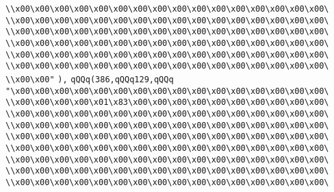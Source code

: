 \verb|\\x00\x00\x00\x00\x00\x00\x00\x00\x00\x00\x00\x00\x00\x00\x00\x00\|\newline
\verb|\\x00\x00\x00\x00\x00\x00\x00\x00\x00\x00\x00\x00\x00\x00\x00\x00\|\newline
\verb|\\x00\x00\x00\x00\x00\x00\x00\x00\x00\x00\x00\x00\x00\x00\x00\x00\|\newline
\verb|\\x00\x00\x00\x00\x00\x00\x00\x00\x00\x00\x00\x00\x00\x00\x00\x00\|\newline
\verb|\\x00\x00\x00\x00\x00\x00\x00\x00\x00\x00\x00\x00\x00\x00\x00\x00\|\newline
\verb|\\x00\x00\x00\x00\x00\x00\x00\x00\x00\x00\x00\x00\x00\x00\x00\x00\|\newline
\verb|\\x00\x00"|\newline
\verb|),|\newline
\verb|qQQq(386,qQQq129,qQQq|\newline
\verb|"\x00\x00\x00\x00\x00\x00\x00\x00\x00\x00\x00\x00\x00\x00\x00\x00\|\newline
\verb|\\x00\x00\x00\x00\x01\x83\x00\x00\x00\x00\x00\x00\x00\x00\x00\x00\|\newline
\verb|\\x00\x00\x00\x00\x00\x00\x00\x00\x00\x00\x00\x00\x00\x00\x00\x00\|\newline
\verb|\\x00\x00\x00\x00\x00\x00\x00\x00\x00\x00\x00\x00\x00\x00\x00\x00\|\newline
\verb|\\x00\x00\x00\x00\x00\x00\x00\x00\x00\x00\x00\x00\x00\x00\x00\x00\|\newline
\verb|\\x00\x00\x00\x00\x00\x00\x00\x00\x00\x00\x00\x00\x00\x00\x00\x00\|\newline
\verb|\\x00\x00\x00\x00\x00\x00\x00\x00\x00\x00\x00\x00\x00\x00\x00\x00\|\newline
\verb|\\x00\x00\x00\x00\x00\x00\x00\x00\x00\x00\x00\x00\x00\x00\x00\x00\|\newline
\verb|\\x00\x00\x00\x00\x00\x00\x00\x00\x00\x00\x00\x00\x00\x00\x00\x00\|\newline
